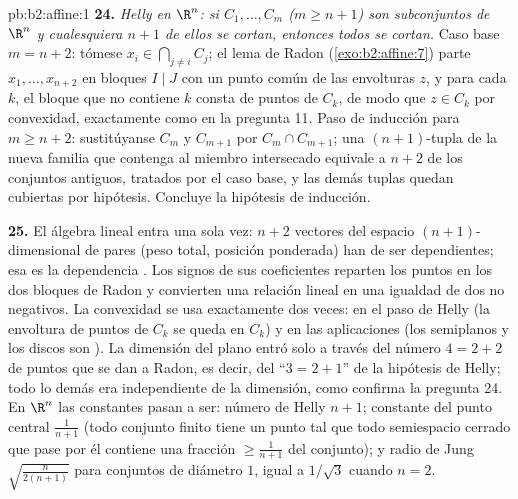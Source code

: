 \begin{solution}{pb:b2:affine:1}
\textbf{24.} \emph{Helly en $\R^n$: si $C_1, \dots, C_m$ ($m \geq n +
1$) son subconjuntos  de $\R^n$ y cualesquiera $n + 1$ de
ellos se cortan, entonces todos se cortan.} Caso base $m = n + 2$:
tómese $x_i \in \bigcap_{j\neq i}C_j$; el lema de Radon
(\cref{exo:b2:affine:7}) parte $x_1, \dots, x_{n+2}$ en bloques $I
\mid J$ con un punto común de las envolturas $z$, y para cada $k$, el
bloque que no contiene $k$ consta de puntos de $C_k$, de modo que $z
\in C_k$ por convexidad, exactamente como en la pregunta 11. Paso de
inducción para $m \geq n + 2$: sustitúyanse $C_m$ y $C_{m+1}$ por
$C_m \cap C_{m+1}$; una $(n+1)$-tupla de la nueva familia que
contenga al miembro intersecado equivale a $n + 2$ de los conjuntos
antiguos, tratados por el caso base, y las demás tuplas quedan
cubiertas por hipótesis. Concluye la hipótesis de inducción.

\textbf{25.} El álgebra lineal entra una sola vez: $n + 2$ vectores
del espacio $(n+1)$-dimensional de pares (peso total, posición
ponderada) han de ser dependientes; esa es la dependencia . Los
signos de sus coeficientes reparten los puntos en los dos bloques de
Radon y convierten una relación lineal en una igualdad de dos
 no negativos. La convexidad se usa exactamente dos
veces: en el paso de Helly (la envoltura de puntos de $C_k$ se queda
en $C_k$) y en las aplicaciones (los semiplanos y los discos son
). La dimensión del plano entró solo a través del número $4
= 2 + 2$ de puntos que se dan a Radon, es decir, del ``$3 = 2 + 1$''
de la hipótesis de Helly; todo lo demás era independiente de la
dimensión, como confirma la pregunta 24. En $\R^n$ las constantes
pasan a ser: número de Helly $n + 1$; constante del punto central
$\frac1{n+1}$ (todo conjunto finito tiene un punto tal que todo
semiespacio cerrado que pase por él contiene una fracción $\geq
\frac1{n+1}$ del conjunto); y radio de Jung
$\sqrt{\frac{n}{2(n+1)}}$ para conjuntos de diámetro $1$, igual a
$1/\sqrt3$ cuando $n = 2$.
\end{solution}
